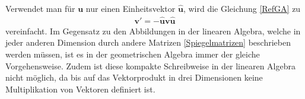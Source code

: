 Verwendet man für $\mathbf{u}$ nur einen Einheitsvektor $\mathbf{\hat{u}}$, wird die Gleichung \eqref{RefGA} zu
\begin{align}
\mathbf{v'} = -\mathbf{\hat{u}v\hat{u}}
\end{align}
vereinfacht.
Im Gegensatz zu den Abbildungen in der linearen Algebra, welche in
jeder anderen Dimension durch andere Matrizen \eqref{Spiegelmatrizen}
beschrieben werden müssen, ist es in der geometrischen Algebra immer
der gleiche Vorgehensweise.
Zudem ist diese kompakte Schreibweise in der linearen Algebra nicht
möglich, da bis auf das Vektorprodukt in drei Dimensionen keine
Multiplikation von Vektoren definiert ist.
